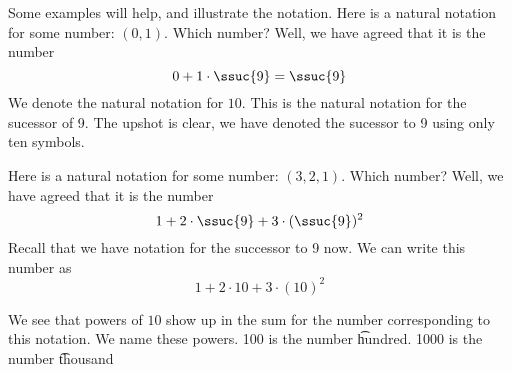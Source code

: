Some examples will help, and illustrate the notation.
Here is a natural notation for some number: $(0, 1)$.
Which number?
Well, we have agreed that it is the number
\[
0 + 1\cdot \ssuc{9} = \ssuc{9}
\]
We denote the natural notation for $10$.
This is the natural notation for the sucessor of 9.
The upshot is clear, we have denoted the sucessor to 9 using only ten symbols.

Here is a natural notation for some number: $(3, 2, 1)$.
Which number?
Well, we have agreed that it is the number
\[
1 + 2\cdot \ssuc{9} + 3\cdot (\ssuc{9})^2
\]
Recall that we have notation for the successor to 9 now.
We can write this number as
\[
1 + 2\cdot 10 + 3\cdot (10)^2
\]

We see that powers of $10$ show up in the sum for the number corresponding to this notation.
We name these powers.
100 is the number \t{hundred}.
1000 is the number \t{thousand}

\blankpage